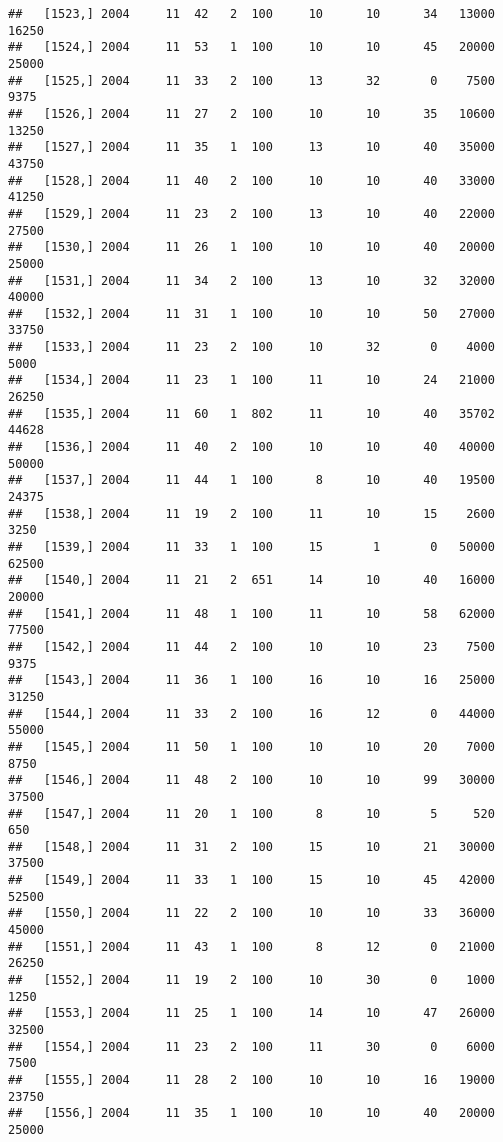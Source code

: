 \documentclass{article}\usepackage[]{graphicx}\usepackage[]{color}
\makeatletter
\newenvironment{kframe}{%
 \def\at@end@of@kframe{}%
 \ifinner\ifhmode%
  \def\at@end@of@kframe{\end{minipage}}%
  \begin{minipage}{\columnwidth}%
 \fi\fi%
 \def\FrameCommand##1{\hskip\@totalleftmargin \hskip-\fboxsep
 \colorbox{shadecolor}{##1}\hskip-\fboxsep
     \hskip-\linewidth \hskip-\@totalleftmargin \hskip\columnwidth}%
 \MakeFramed {\advance\hsize-\width
   \@totalleftmargin\z@ \linewidth\hsize
   \@setminipage}}%
 {\par\unskip\endMakeFramed%
 \at@end@of@kframe}
\newenvironment{knitrout}{}{} %
\makeatother
\begin{document}
\begin{knitrout}
\begin{kframe}
\begin{verbatim}
##   [1523,] 2004     11  42   2  100     10      10      34   13000   16250
##   [1524,] 2004     11  53   1  100     10      10      45   20000   25000
##   [1525,] 2004     11  33   2  100     13      32       0    7500    9375
##   [1526,] 2004     11  27   2  100     10      10      35   10600   13250
##   [1527,] 2004     11  35   1  100     13      10      40   35000   43750
##   [1528,] 2004     11  40   2  100     10      10      40   33000   41250
##   [1529,] 2004     11  23   2  100     13      10      40   22000   27500
##   [1530,] 2004     11  26   1  100     10      10      40   20000   25000
##   [1531,] 2004     11  34   2  100     13      10      32   32000   40000
##   [1532,] 2004     11  31   1  100     10      10      50   27000   33750
##   [1533,] 2004     11  23   2  100     10      32       0    4000    5000
##   [1534,] 2004     11  23   1  100     11      10      24   21000   26250
##   [1535,] 2004     11  60   1  802     11      10      40   35702   44628
##   [1536,] 2004     11  40   2  100     10      10      40   40000   50000
##   [1537,] 2004     11  44   1  100      8      10      40   19500   24375
##   [1538,] 2004     11  19   2  100     11      10      15    2600    3250
##   [1539,] 2004     11  33   1  100     15       1       0   50000   62500
##   [1540,] 2004     11  21   2  651     14      10      40   16000   20000
##   [1541,] 2004     11  48   1  100     11      10      58   62000   77500
##   [1542,] 2004     11  44   2  100     10      10      23    7500    9375
##   [1543,] 2004     11  36   1  100     16      10      16   25000   31250
##   [1544,] 2004     11  33   2  100     16      12       0   44000   55000
##   [1545,] 2004     11  50   1  100     10      10      20    7000    8750
##   [1546,] 2004     11  48   2  100     10      10      99   30000   37500
##   [1547,] 2004     11  20   1  100      8      10       5     520     650
##   [1548,] 2004     11  31   2  100     15      10      21   30000   37500
##   [1549,] 2004     11  33   1  100     15      10      45   42000   52500
##   [1550,] 2004     11  22   2  100     10      10      33   36000   45000
##   [1551,] 2004     11  43   1  100      8      12       0   21000   26250
##   [1552,] 2004     11  19   2  100     10      30       0    1000    1250
##   [1553,] 2004     11  25   1  100     14      10      47   26000   32500
##   [1554,] 2004     11  23   2  100     11      30       0    6000    7500
##   [1555,] 2004     11  28   2  100     10      10      16   19000   23750
##   [1556,] 2004     11  35   1  100     10      10      40   20000   25000

\end{verbatim}
\end{kframe}
\end{knitrout}
\end{document}
